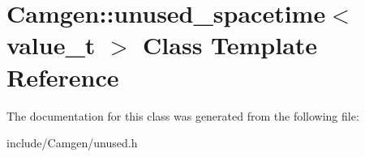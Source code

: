 \hypertarget{a00558}{\section{Camgen\-:\-:unused\-\_\-spacetime$<$ value\-\_\-t $>$ Class Template Reference}
\label{a00558}
}


The documentation for this class was generated from the following file\-:\begin{DoxyCompactItemize}
\item 
include/\-Camgen/unused.\-h\end{DoxyCompactItemize}
